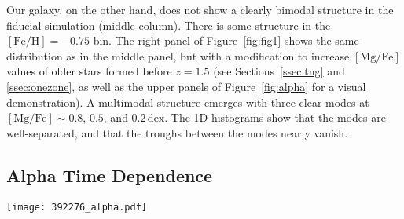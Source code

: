 \documentclass[twocolumn]{aastex631}
\newcommand{\Gyr}{\ensuremath{\textrm{Gyr}}}
\newcommand{\FeH}{\ensuremath{[\textrm{Fe}/\textrm{H}]}}
\newcommand{\MgFe}{\ensuremath{[\textrm{Mg}/\textrm{Fe}]}}
\newcommand{\dex}{\ensuremath{\textrm{dex}}}
\begin{document}
Our galaxy, on the other hand, does not show a clearly bimodal structure in the fiducial simulation (middle column). There is some structure in the $\FeH=-0.75$ bin. The right panel of Figure~\ref{fig:fig1} shows the same distribution as in the middle panel, but with a modification to increase \MgFe{} values of older stars formed before $z=1.5$ (see Sections~\ref{ssec:tng} and \ref{ssec:onezone}, as well as the upper panels of Figure~\ref{fig:alpha} for a visual demonstration). A multimodal structure emerges with three clear modes at $\MgFe\sim0.8$, $0.5$, and $0.2\,\dex$. The 1D histograms show that the modes are well-separated, and that the troughs between the modes nearly vanish.

\subsection{Alpha Time Dependence}\label{ssec:alpha_time}

\begin{figure*}
  \centering
  \texttt{[image: 392276\_alpha.pdf]}
  \caption{\textbf{Bimodality in the abundance plane is linked to distinct epochs separated by quiescence in simulation.} The upper row shows \MgFe{} as a function of age for our subhalo in TNG. The colors indicate stellar populations at fixed values of \FeH{}, which are the same as in Figure~\ref{fig:fig1}. A gap in the relation occurs at an age of approximately $10.6\,\Gyr$, which we indicate with a vertical dashed line. The effect of the $\alpha$-enhancement is clear, as it separates the stars that form before and after this gap in ages (star particles which formed before $z=1.5$ are $\alpha$-enhanced, which occurs at an age of $\sim9.5\,\Gyr$). The middle row shows the same TNG and $\alpha$-enhanced TNG data, but with added uncertainties of $12.5\%$ in age and $0.015\,\dex$ in \MgFe{}. When given these errors, the before and after star particles smear such that the two populations significantly overlap in ages. There is a second population of stars linked to another gap at $\sim8\,\Gyr$, discussed in the text. The lower row shows on the left the Milky Way data and on the right the same TNG data with artificial errors but subsampled to the same number of stars older than $5\,\Gyr$ as in the observations (because the simulation sample has almost no star particles younger than $5\,\Gyr$). The limited sample size of the observations makes a direct comparison difficult.}
  \label{fig:alpha}
\end{figure*}
\end{document}
